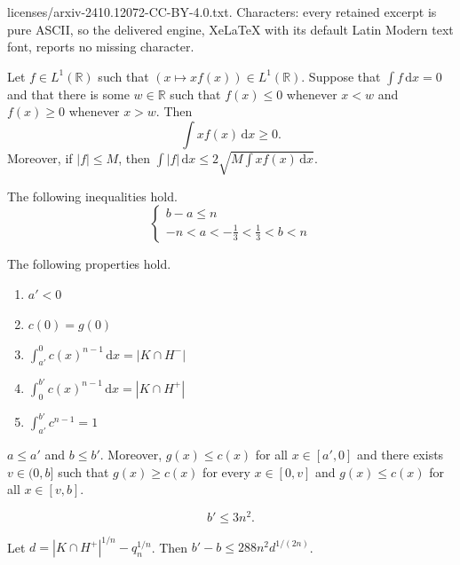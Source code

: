 \documentclass[10pt,a4paper]{amsart}
\newcommand{\dx}[0]{\,\mathrm{d}x}
\begin{document}
licenses/arxiv-2410.12072-CC-BY-4.0.txt. Characters: every retained excerpt is pure ASCII, so the delivered engine, XeLaTeX with its default Latin Modern text font, reports no missing character.
\begin{lema}\label{intxf}
    Let $f\in L^1(\mathbb{R})$ such that $(x\mapsto xf(x))\in L^1(\mathbb{R})$. Suppose that $\int f\dx=0$ and that there is some $w\in \mathbb{R}$ such that $f(x)\leq 0$ whenever $x<w$ and $f(x)\geq 0$ whenever $x>w$. Then
    $$\int xf(x)\dx\geq 0.$$
    Moreover, if $|f|\leq M$, then $\int |f|\dx\leq 2\sqrt{M\int xf(x)\dx}$.
\end{lema}

\begin{lema}\label{abbounds} The following inequalities hold.
\begin{equation*}
    \begin{cases}
        b-a\leq n\\
        -n<a<-\frac13<\frac13 < b < n
    \end{cases}
\end{equation*}
\end{lema}

\begin{prop}\label{propdefi2}
    The following properties hold.
    \begin{enumerate}
    \item $a'< 0$
        \item $c(0)=g(0)$
        \item $\int_{a'}^0c(x)^{n-1}\dx=|K\cap H^-|$
        \item $\int_0^{b'}c(x)^{n-1}\dx=|K\cap H^+|$
        \item $\int_{a'}^{b'} c^{n-1}=1$
    \end{enumerate}
\end{prop}

\begin{prop}\label{aborder}
    $a\leq a'$ and $b\leq b'$. Moreover, $g(x)\leq c(x)$ for all $x\in [a',0]$ and there exists $v\in (0,b]$ such that $g(x)\geq c(x)$ for every $x\in [0,v]$ and $g(x)\leq c(x)$ for all $x\in [v,b]$.
\end{prop}

\begin{equation}\label{bprimebound}
    b'\leq 3n^2.
\end{equation}

\begin{prop}\label{bprimebbound}
Let $d=|K\cap H^+|^{1/n}-q_n^{1/n}$. Then $b'-b\leq 288n^2 d^{1/(2n)}$.
\end{prop}
\end{document}
